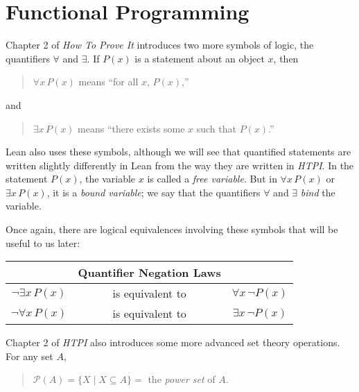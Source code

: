 \documentclass[
  letterpaper,
  DIV=11,
  numbers=noendperiod]{scrreprt}
\theoremstyle{remark}
\begin{document}
\hypertarget{functional-programming}{%
\chapter{Functional Programming}\label{functional-programming}}


Chapter 2 of \emph{How To Prove It} introduces two more symbols of
logic, the quantifiers \(\forall\) and \(\exists\). If \(P(x)\) is a
statement about an object \(x\), then

\begin{quote}
\(\forall x\,P(x)\) means ``for all \(x\), \(P(x)\),''

\end{quote}

and

\begin{quote}
\(\exists x\,P(x)\) means ``there exists some \(x\) such that
\(P(x)\).''

\end{quote}

Lean also uses these symbols, although we will see that quantified
statements are written slightly differently in Lean from the way they
are written in \emph{HTPI}. In the statement \(P(x)\), the variable
\(x\) is called a \emph{free variable}. But in \(\forall x\,P(x)\) or
\(\exists x\,P(x)\), it is a \emph{bound variable}; we say that the
quantifiers \(\forall\) and \(\exists\) \emph{bind} the variable.

Once again, there are logical equivalences involving these symbols that
will be useful to us later:

\begin{longtable}[]{@{}ccc@{}}
\toprule\noalign{}
& Quantifier Negation Laws & \\
\midrule\noalign{}
\endhead
\bottomrule\noalign{}
\endlastfoot
\(\neg \exists x\,P(x)\) & is equivalent to &
\(\forall x\,\neg P(x)\) \\
\(\neg \forall x\,P(x)\) & is equivalent to &
\(\exists x\,\neg P(x)\) \\
\end{longtable}

Chapter 2 of \emph{HTPI} also introduces some more advanced set theory
operations. For any set \(A\),

\begin{quote}
\(\mathscr{P}(A) = \{X \mid X \subseteq A\} = {}\) the \emph{power set}
of \(A\).

\end{quote}
\end{document}
